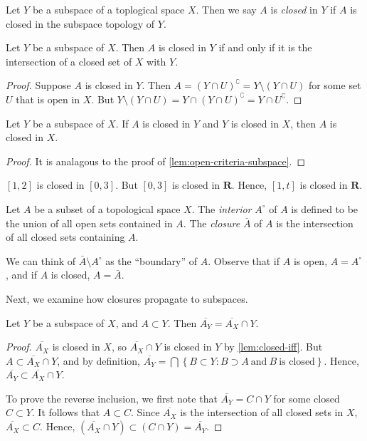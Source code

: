 \begin{definition}
	\label{def:closed-set-subspace}
	Let $Y$ be a subspace of a toplogical space $X$. Then we say $A$
	is \emph{closed} in $Y$ if $A$ is closed in the subspace topology of
	$Y$.
\end{definition}
\begin{lemma}
	\label{lem:closed-iff}
	Let $Y$ be a subspace of $X$. Then $A$ is closed in $Y$ if and only if
	it is the intersection of a closed set of $X$ with $Y$.
\end{lemma}
\begin{proof}
	Suppose $A$ is closed in $Y$. Then $A = (Y \cap U)^{\complement} = Y \setminus
	(Y \cap U)$ for some set $U$ that is open in $X$.
	But $Y \setminus (Y \cap U) = Y \cap (Y \cap U)^{\complement} = Y \cap
	U^{\complement}$.
\end{proof}
\begin{lemma}
	Let $Y$ be a subspace of $X$. If $A$ is closed in $Y$ and $Y$ is closed in
	$X$, then $A$ is closed in $X$.
\end{lemma}
\begin{proof}
	It is analagous to the proof of \cref{lem:open-criteria-subspace}.
\end{proof}
\begin{example}
	$[1,2]$ is closed in $[0,3]$. But
	$[0,3]$ is closed in $\mathbf{R}$. Hence,
	$[1,t]$ is closed in $\mathbf{R}$.
\end{example}
\begin{definition}
	\label{def:interior}
	Let $A$ be a subset of a topological space $X$. The \emph{interior}
	$A^{\circ}$ of
	$A$ is defined to be the union of all open sets contained in $A$.
	The \emph{closure} $\bar{A}$ of $A$ is the intersection of all closed
	sets containing $A$.
\end{definition}
\begin{remark}
	\label{rem:intuition-closure}
	We can think of $\bar{A} \setminus A^{\circ}$ as the ``boundary''
	of $A$. Observe that if $A$ is open, $A = A^{\circ}$, and if $A$ is closed,
	$A = \bar{A}$.
\end{remark}
Next, we examine how closures propagate to subspaces.
\begin{theorem}
	\label{thm:closure-prop}
	Let $Y$ be a subspace of $X$, and $A \subset Y$. Then
	$\overline{A_{Y}} = \overline{A_{X}} \cap Y$.
\end{theorem}
\begin{proof}
	$\overline{A_{X}}$ is closed in $X$, so $\overline{A_{X}} \cap Y$ is closed in $Y$
	by \cref{lem:closed-iff}. But $A \subset \overline{A_{X}} \cap Y$, and by
	definition, $\overline{A_{Y}} = \bigcap\left\{ B \subset Y: B \supset A \
		\text{and} \
	B \ \text{is closed}\right\}$. Hence, $\overline{A_{Y}} \subset
	\overline{A_{X}} \cap Y$.
	\par
	To prove the reverse inclusion, we first note that
	$\overline{A_{Y}} = C \cap Y$ for some closed $C \subset Y$.
	It follows that $A \subset C$. Since $\overline{A_{X}}$ is the intersection of
	all closed sets in $X$, $\overline{A_{X}} \subset C$. Hence,
	$(\overline{A_{X}}\cap Y) \subset (C \cap Y) = \overline{A_{Y}}$.
\end{proof}
